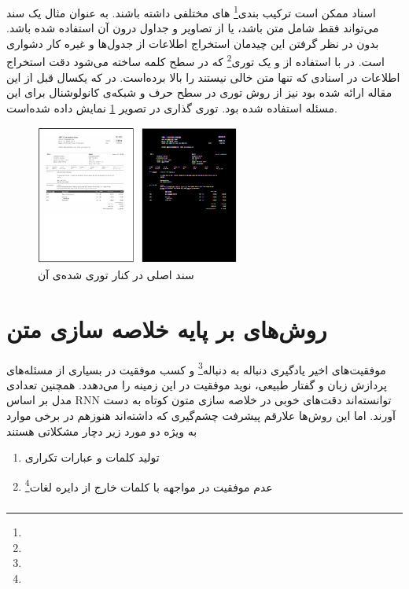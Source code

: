 \documentclass[12pt, a4paper, oneside]{report}
\begin{document}
اسناد ممکن است ترکیب بندی\footnote{}
های مختلفی داشته باشند. به عنوان مثال یک سند می‌تواند فقط شامل متن باشد، یا از تصاویر و جداول درون آن استفاده‌
شده باشد. بدون در نظر گرفتن این چیدمان استخراج اطلاعات از جدول‌ها و غیره کار دشواری است. در
\cite{denk2019bertgrid}
با استفاده از
و یک
توری\footnote{}
که در سطح کلمه ساخته می‌شود دقت استخراج اطلاعات در اسنادی که تنها متن خالی نیستند را بالا برده‌است. در
\cite{katti2018chargrid}
که یکسال قبل از این مقاله ارائه شده بود نیز از روش توری در سطح حرف و شبکه‌ی کانولوشنال برای
این مسئله استفاده شده بود. توری گذاری در تصویر
\ref{fig:grid}
نمایش داده شده‌است.

\begin{figure}[!ht]
    \centering
    \includegraphics[width=0.6\textwidth]{grid}
    \caption{ سند اصلی در کنار توری شده‌ی آن }
    \label{fig:grid}
\end{figure}

\section{روش‌های بر پایه خلاصه سازی متن}

موفقیت‌های اخیر یادگیری دنباله به دنباله\footnote{}
و کسب موفقیت در بسیاری از مسئله‌های پردازش زبان و گفتار طبیعی، نوید موفقیت در این زمینه را می‌دهدد. همچنین
تعدادی مدل بر اساس
RNN
توانسته‌اند دقت‌های خوبی در خلاصه سازی متون کوتاه به دست آورند.
اما این روش‌ها علارقم پیشرفت چشم‌گیری که داشته‌اند هنوزهم در برخی موارد به ویژه دو مورد زیر
دچار مشکلاتی هستند
\cite{el2021automatic}

\begin{enumerate}
    \item تولید کلمات و عبارات تکراری
    \item عدم موفقیت در مواجهه با کلمات خارج از دایره لغات\footnote{}
\end{enumerate}

\subsubsection{}
\end{document}
